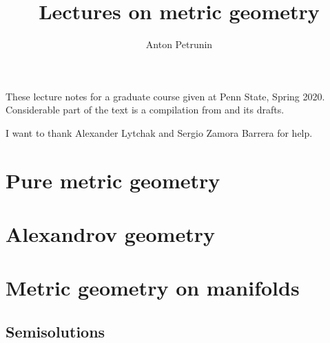 \documentclass[twoside]{book}
\begin{document}
 
\title{Lectures on metric geometry}
\author{Anton Petrunin}
\date{}
\maketitle

These lecture notes for a graduate course given at Penn State, Spring 2020.
Considerable part of the text is a compilation from \cite{alexander-kapovitch-petrunin-2019, alexander-kapovitch-petrunin-2025, petrunin-yashinski, petrunin-2009, petrunin-zamorabarrera} and its drafts.

I want to thank Alexander Lytchak and Sergio Zamora Barrera for help.

\thispagestyle{empty}
\tableofcontents
\thispagestyle{empty}

%
\part{Pure metric geometry}




%


\part{Alexandrov geometry}







\part{Metric geometry on manifolds}


%
%
%

\appendix
\chapter{Semisolutions}








%
{\small\sloppy


\def\emph{\textit}

\printbibliography[heading=bibintoc]
\fussy
}
\end{document}
